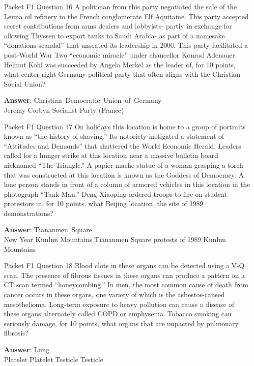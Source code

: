\begin{frame}{Packet F1 Question 16}
A politician from this party negotiated the   sale of the Leuna oil refinery to the French conglomerate Elf Aquitaine. This party accepted secret contributions from arms dealers and lobbyists- partly in exchange for allowing Thyssen to export tanks to Saudi Arabia- as part of a namesake “donations scandal” that unseated its leadership in 2000. This party facilitated   a post-World War Two “economic miracle” under chancellor Konrad Adenauer. Helmut   Kohl was succeeded by Angela Merkel as the leader of,   for 10 points, what center-right Germany political party that often aligns with the Christian Social Union?  

\textbf{Answer}: Christian\ Democratic\ Union\ of\ Germany\\
 Jeremy Corbyn
 Socialist Party (France)
\end{frame}

\begin{frame}{Packet F1 Question 17}
On holidays this location   is home to a group of portraits known as ``the history of shaving.'' Its notoriety instigated a statement of ``Attitudes and Demands'' that shuttered the World   Economic Herald. Leaders called for a hunger strike at this location near a massive bulletin board nicknamed “The Triangle.” A papier-mache statue of a woman grasping a torch that was constructed at this location is known as the Goddess of Democracy. A lone person stands in front of a column of armored vehicles in this location in the photograph “Tank Man.” Deng Xiaoping ordered     troops to fire on student protestors in, for 10 points, what Beijing location, the site of 1989 demonstrations?    

\textbf{Answer}: Tiananmen\ Square\\
 New Year
 Kunlun Mountains
 Tiananmen Square protests of 1989
 Kunlun Mountains
\end{frame}

\begin{frame}{Packet F1 Question 18}
Blood clots in these organs     can be detected using a V-Q scan. The presence of fibrous tissues in these organs can produce   a pattern on a CT scan termed “honeycombing.” In men, the most common cause of death from cancer occurs   in these organs, one variety of which is the asbestos-caused mesothelioma. Long-term exposure to heavy pollution can cause a disease of   these organs alternately called COPD or emphysema. Tobacco smoking can seriously damage, for 10 points, what organs that are impacted by pulmonary fibrosis?    

\textbf{Answer}: Lung\\
 Platelet
 Platelet
 Testicle
 Testicle
\end{frame}

